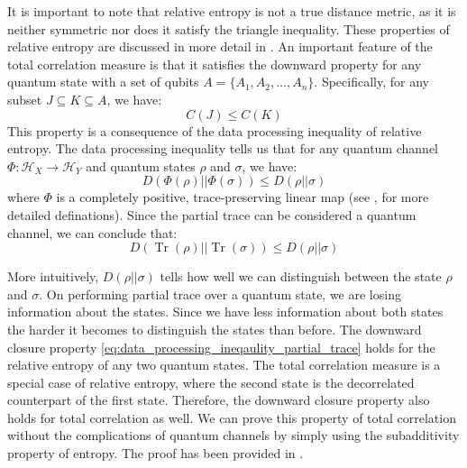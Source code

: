 \documentclass{article}
\DeclareMathOperator{\Tr}{Tr}
\begin{document}
It is important to note that relative entropy is not a true distance metric, as it is neither symmetric nor does it satisfy the triangle inequality. These properties of relative entropy are discussed in more detail in \cite{vedral2002relativeentropy}. An important feature of the total correlation measure is that it satisfies the downward property for any quantum state with a set of qubits $ A = \{A_1, A_2, \dots, A_n\} $. Specifically, for any subset $ J \subseteq K \subseteq A $, we have:
\begin{equation}
    \label{eq:downward_closure_total_correlation}
    C(J) \leq C(K)
\end{equation}
This property is a consequence of the data processing inequality of relative entropy. The data processing inequality tells us that for any quantum channel $ \Phi : \mathcal{H}_X \to \mathcal{H}_Y $ and quantum states $ \rho $ and $ \sigma $, we have:
\begin{equation}
\label{eq:data_processing_ineqaulity}
D(\Phi(\rho) || \Phi(\sigma)) \leq D(\rho || \sigma)
\end{equation}
where $ \Phi $ is a completely positive, trace-preserving linear map (see \cite{watrous2018theory}, \cite{dataprocessingnielsen} for more detailed definations). Since the partial trace can be considered a quantum channel, we can conclude that:
\begin{equation}
\label{eq:data_processing_ineqaulity_partial_trace}
D(\Tr(\rho) || \Tr(\sigma)) \leq D(\rho || \sigma)
\end{equation}

 More intuitively, $D(\rho || \sigma)$ tells how well we can distinguish between the state $\rho$ and $\sigma$. On performing partial trace over a quantum state, we are losing information about the states. Since we have less information about both states the harder it becomes to distinguish the states than before. The downward closure property \ref{eq:data_processing_ineqaulity_partial_trace} holds for the relative entropy of any two quantum states. The total correlation measure is a special case of relative entropy, where the second state is the decorrelated counterpart of the first state. Therefore, the downward closure property also holds for total correlation as well. We can prove this property of total correlation without the complications of quantum channels by simply using the subadditivity property of entropy. The proof has been provided in \cite{hamilton2023probing}.
\end{document}
